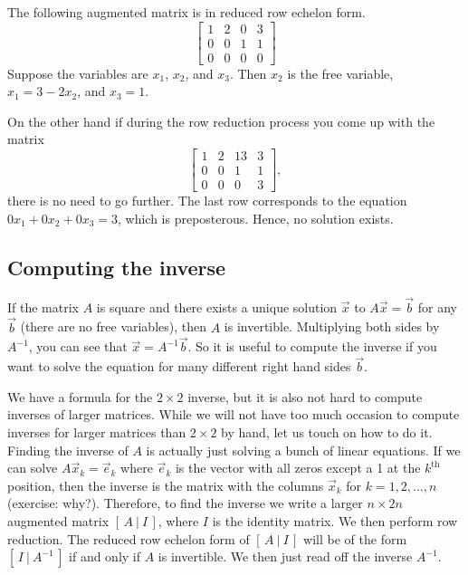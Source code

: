 \documentclass[12pt]{book}
\begin{document}
\begin{example}
The following augmented matrix is in reduced row echelon form.
\begin{equation*}
\left[
\begin{array}{ccc|c}
1 & 2 & 0 & 3 \\
0 & 0 & 1 & 1 \\
0 & 0 & 0 & 0
\end{array}
\right]
\end{equation*}
Suppose
the variables are $x_1$, $x_2$, and $x_3$.  Then $x_2$ is the
free variable, $x_1 = 3 - 2x_2$, and $x_3 = 1$.

\medskip

On the other hand if during the row reduction process you come up with the
matrix
\begin{equation*}
\left[
\begin{array}{ccc|c}
1 & 2 & 13 & 3 \\
0 & 0 & 1 & 1 \\
0 & 0 & 0 & 3
\end{array}
\right]
,
\end{equation*}
there is no need to go further.  The last row corresponds to
the equation $0 x_1 + 0 x_2 + 0 x_3 = 3$, which is preposterous.  Hence, no
solution exists.
\end{example}

\subsection{Computing the inverse}

If the matrix $A$ is square and there exists a unique solution
$\vec{x}$ to $A \vec{x} = \vec{b}$ for any $\vec{b}$ (there are no free
variables), then $A$ is invertible.
Multiplying both sides by $A^{-1}$, you can see that $\vec{x} =
A^{-1} \vec{b}$.  So it is useful to compute the inverse if you want to
solve the equation for many different right hand sides $\vec{b}$.

We have a formula for
the $2 \times 2$ inverse, but it is also not hard
to compute inverses of larger matrices.
While we will not have too much occasion to compute inverses for larger
matrices than $2 \times 2$ by hand, let us touch on how to do it.
Finding the inverse of $A$ is actually just solving a bunch of linear
equations.  If we can solve $A \vec{x}_k = \vec{e}_k$ where $\vec{e}_k$ is
the vector with all zeros except a 1 at the $k^{\text{th}}$ position, then
the inverse is the matrix with the columns $\vec{x}_k$ for $k=1,2,\ldots,n$
(exercise: why?).  Therefore, to find the inverse we write a larger $n
\times 2n$ augmented matrix $[ \,A ~|~ I\, ]$, where $I$ is the identity
matrix.
We then perform row reduction.
The reduced row echelon form of $[ \,A ~|~ I\, ]$ 
will be of the form $[ \,I ~|~ A^{-1}\, ]$ if and only if
$A$ is invertible.  We then just read off the inverse $A^{-1}$.
\end{document}

